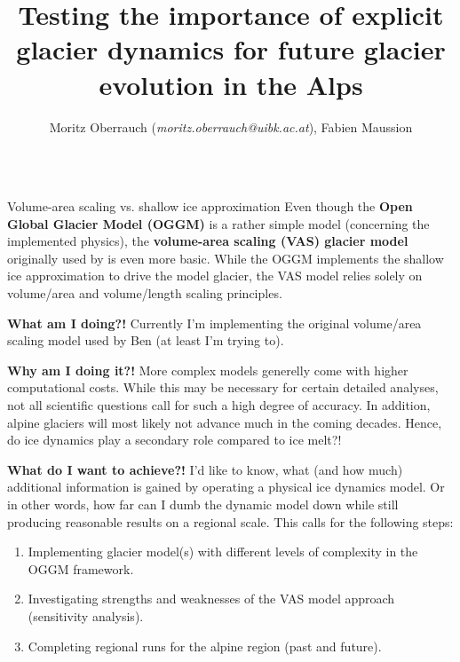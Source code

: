 \documentclass[final]{beamer}
\title{Testing the importance of explicit glacier dynamics for future glacier evolution in the Alps}
\author{Moritz Oberrauch (\textit{moritz.oberrauch@uibk.ac.at}), Fabien Maussion}
\begin{document}
\begin{frame}[fragile]
\begin{columns}[t]

\begin{leftcolumn}

   \begin{boxblock}{Volume-area scaling vs. shallow ice approximation}
      Even though the \textbf{Open Global Glacier Model (OGGM)} is a rather simple model (concerning the implemented physics), the \textbf{volume-area scaling (VAS) glacier model} originally used by \citet{Marzeion2012} is even more basic. While the OGGM implements the shallow ice approximation to drive the model glacier, the VAS model relies solely on volume/area and volume/length scaling principles.
      
      \textbf{What am I doing?!} Currently I'm implementing the original volume/area scaling model used by Ben (at least I'm trying to).
      
      \textbf{Why am I doing it?!} More complex models generelly come with higher computational costs. While this may be necessary for certain detailed analyses, not all scientific questions call for such a high degree of accuracy. In addition, alpine glaciers will most likely not advance much in the coming decades. Hence, do ice dynamics play a secondary role compared to ice melt?!

      \textbf{What do I want to achieve?!} I'd like to know, what (and how much) additional information is gained by operating a physical ice dynamics model. Or in other words, how far can I dumb the dynamic model down while still producing reasonable results on a regional  scale. This calls for the following steps:
      \begin{enumerate}
         \item Implementing glacier model(s) with different levels of complexity in the OGGM framework.
         \item Investigating strengths and weaknesses of the VAS model approach (sensitivity analysis).
         \item Completing regional runs for the alpine region (past and future).
      \end{enumerate}
   \end{boxblock} %


\end{leftcolumn}
\end{columns}
\end{frame}
\end{document}
